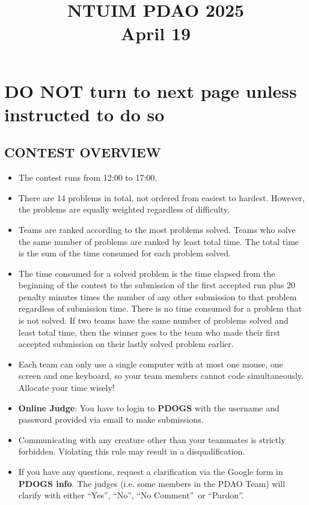 \documentclass[12pt,a4paper]{article}
\begin{document}
\title{\textbf{NTUIM PDAO 2025}\\ April 19}
\date{}
\maketitle
\thispagestyle{fancy}
\section*{DO NOT turn to next page unless instructed to do so}
\subsection*{CONTEST OVERVIEW}
\begin{itemize} 
    \item The contest runs from 12:00 to 17:00.
    \item There are 14 problems in total, not ordered from easiest to hardest. However, the problems are equally weighted regardless of difficulty.
    \item Teams are ranked according to the most problems solved. Teams who solve the same number of problems are ranked by least total time. The total time is the sum of the time consumed for each problem solved. 
    \item The time consumed for a solved problem is the time elapsed from the beginning of the contest to the submission of the first accepted run plus 20 penalty minutes times the number of any other submission to that problem regardless of submission time. There is no time consumed for a problem that is not solved. If two teams have the same number of problems solved and least total time, then the winner goes to the team who made their first accepted submission on their lastly solved problem earlier.
    \item Each team can only use a single computer with at most one mouse, one screen and one keyboard, so your team members cannot code simultaneously. Allocate your time wisely! 
    \item \textbf{Online Judge}: You have to login to \textbf{PDOGS} with the username and password provided via email to make submissions.
    \item Communicating with any creature other than your teammates is strictly forbidden. Violating this rule may result in a disqualification.
    \item If you have any questions, request a clarification via the Google form in \textbf{PDOGS info}. The judges (i.e. some members in the PDAO Team) will clarify with either \textquotedblleft Yes\textquotedblright, \textquotedblleft No\textquotedblright, \textquotedblleft No Comment\textquotedblright\ or \textquotedblleft Pardon\textquotedblright.
\end{itemize}
\end{document}
